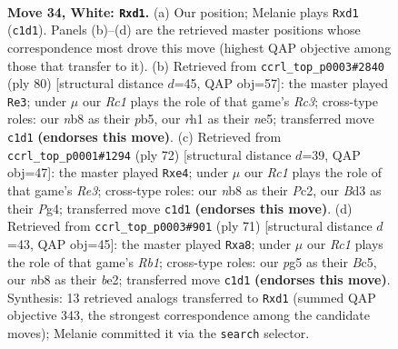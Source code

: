 \documentclass[11pt]{article}
\begin{document}
\clearpage

\begin{figure}[p]\centering
\begin{subfigure}{0.46\textwidth}\centering
\resizebox{\linewidth}{!}{%
\newchessgame
\chessboard[
  setfen={1nN5/6k1/1p2p3/6p1/5p2/3B1P2/2P3K1/2Rr3r w - - 0 34},
  showmover=false,
  pgfstyle=straightmove, color=movearrow, markmove={c1-d1}
]}
\caption{}
\end{subfigure}\hfill
\begin{subfigure}{0.46\textwidth}\centering
\resizebox{\linewidth}{!}{%
\newchessgame
\chessboard[
  setfen={6k1/8/p2Pp3/1p2n1p1/1Br5/P1R5/6P1/5K2 w - - 0 41},
  showmover=false,
  pgfstyle=straightmove, color=movearrow, markmove={c3-e3}
]}
\caption{}
\end{subfigure}
\\[4pt]
\begin{subfigure}{0.46\textwidth}\centering
\resizebox{\linewidth}{!}{%
\newchessgame
\chessboard[
  setfen={4r1k1/5p2/3R2p1/pp6/4r1P1/4R2P/P1P5/1K6 w - - 0 37},
  showmover=false,
  pgfstyle=straightmove, color=movearrow, markmove={e3-e4}
]}
\caption{}
\end{subfigure}\hfill
\begin{subfigure}{0.46\textwidth}\centering
\resizebox{\linewidth}{!}{%
\newchessgame
\chessboard[
  setfen={Rr6/3bpk2/6p1/1pbP4/6P1/8/4B1K1/R7 b - - 3 36},
  showmover=false,
  pgfstyle=straightmove, color=movearrow, markmove={b8-a8}
]}
\caption{}
\end{subfigure}
\caption{\textbf{Move 34, White: \texttt{Rxd1}.} (a) Our position; Melanie plays \texttt{Rxd1} (\texttt{c1d1}). Panels (b)--(d) are the retrieved master positions whose correspondence most drove this move (highest QAP objective among those that transfer to it). (b) Retrieved from \texttt{ccrl\_top\_p0003\#2840} (ply 80) [structural distance $d$=45, QAP obj=57]: the master played \texttt{Re3}; under $\mu$ our \emph{Rc1} plays the role of that game's \emph{Rc3}; cross-type roles: our \emph{n}b8 as their \emph{p}b5, our \emph{r}h1 as their \emph{n}e5; transferred move \texttt{c1d1} \textbf{(endorses this move)}. (c) Retrieved from \texttt{ccrl\_top\_p0001\#1294} (ply 72) [structural distance $d$=39, QAP obj=47]: the master played \texttt{Rxe4}; under $\mu$ our \emph{Rc1} plays the role of that game's \emph{Re3}; cross-type roles: our \emph{n}b8 as their \emph{P}c2, our \emph{B}d3 as their \emph{P}g4; transferred move \texttt{c1d1} \textbf{(endorses this move)}. (d) Retrieved from \texttt{ccrl\_top\_p0003\#901} (ply 71) [structural distance $d$=43, QAP obj=45]: the master played \texttt{Rxa8}; under $\mu$ our \emph{Rc1} plays the role of that game's \emph{Rb1}; cross-type roles: our \emph{p}g5 as their \emph{B}c5, our \emph{n}b8 as their \emph{b}e2; transferred move \texttt{c1d1} \textbf{(endorses this move)}. Synthesis: 13 retrieved analogs transferred to \texttt{Rxd1} (summed QAP objective 343, the strongest correspondence among the candidate moves); Melanie committed it via the \texttt{search} selector.}
\label{fig:thought-m66}
\end{figure}
\end{document}
